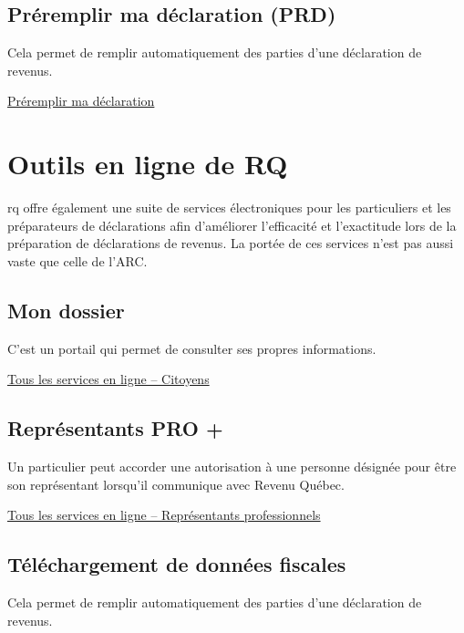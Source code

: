 \subsection{Préremplir ma déclaration (PRD)}
Cela permet de remplir automatiquement des parties d'une déclaration de revenus.

\href{https://www.canada.ca/fr/agence-revenu/services/services-electroniques/a-propos-preremplir-declaration.html}{Préremplir ma déclaration}



\section{Outils en ligne de RQ}
\begin{intro}
	\acrfull{rq} offre également une suite de services électroniques pour les particuliers et les préparateurs de déclarations afin d'améliorer l'efficacité et l'exactitude lors de la préparation de déclarations de revenus. La portée de ces services n'est pas aussi vaste que celle de l'ARC.
\end{intro}


\subsection{Mon dossier}
C'est un portail qui permet de consulter ses propres informations.

\href{https://www.revenuquebec.ca/fr/services-en-ligne/services-en-ligne/services-en-ligne/citoyens/}{Tous les services en ligne – Citoyens}


\subsection{Représentants PRO +}
Un particulier peut accorder une autorisation à une personne désignée pour être son représentant lorsqu'il communique avec Revenu Québec.

\href{https://www.revenuquebec.ca/fr/services-en-ligne/services-en-ligne/services-en-ligne/representants-professionnels/}{Tous les services en ligne – Représentants professionnels}


\subsection{Téléchargement de données fiscales}
Cela permet de remplir automatiquement des parties d'une déclaration de revenus.



